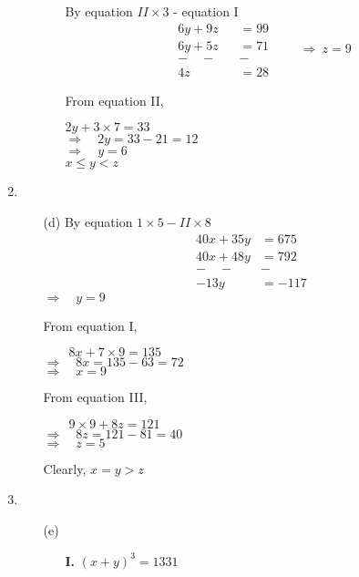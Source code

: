 \begin{multicols}{2}
\begin{enumerate}
\begin{itemize}
\begin{itemize}
      By equation $II \times 3$ - equation I
      \begin{equation*}
        \begin{array}{cc}
          6y + 9z & = 99\\
          6y + 5z & = 71\\
          - \quad - \quad & -\\
          \hline
          4z & = 28
        \end{array}
        \qquad\Rightarrow \ z = 9
      \end{equation*}

      From equation II,

      $2y + 3 \times 7 = 33$\\
      $\Rightarrow\quad 2y = 33 - 21 = 12$\\
      $\Rightarrow\quad y = 6$\\
      $x \leq y < z$
      \end{itemize}
  \end{itemize}
\item
  \begin{itemize}
  \item[(d)] By equation $1 \times 5 - II \times 8$
    \begin{equation*}
      \begin{array}{cc}
        40x + 35y & = 675\\
        40x + 48y & = 792\\
       - \quad - \quad & -\\
        \hline
        -13y & = -117
        \end{array}
    \end{equation*}
    $\Rightarrow\quad y = 9$

    From equation I,

    $\qquad 8x + 7 \times 9 = 135$\\
    $\Rightarrow\quad 8x = 135 - 63 = 72$\\
    $\Rightarrow\quad x = 9$

    From equation III,

    $\qquad 9 \times 9 + 8z = 121$\\
    $\Rightarrow\quad 8z = 121 - 81 = 40$\\
    $\Rightarrow\quad z = 5$

    Clearly, $x = y > z$
  \end{itemize}
\item
  \begin{itemize}
  \item[(e)]
    \begin{itemize}
    \item[{\bf I.}] $(x + y)^3 = 1331$


\end{itemize}
\end{itemize}
\end{enumerate}
\end{multicols}
